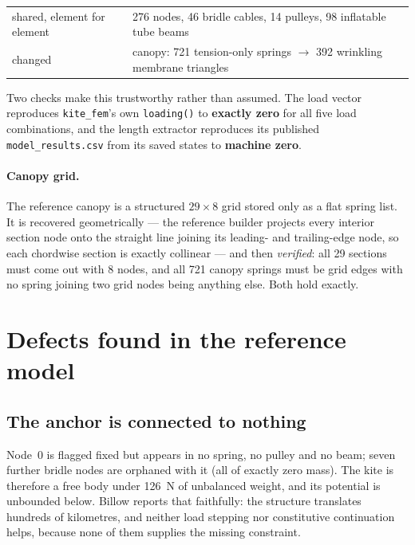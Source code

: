 \documentclass[11pt,a4paper]{article}
\begin{document}
\begin{center}
\begin{tabular}{ll}
\toprule
shared, element for element & 276 nodes, 46 bridle cables, 14 pulleys,
                              98 inflatable tube beams \\
changed & canopy: 721 tension-only springs $\rightarrow$ 392 wrinkling
          membrane triangles \\
\bottomrule
\end{tabular}
\end{center}

Two checks make this trustworthy rather than assumed. The load vector
reproduces \texttt{kite\_fem}'s own \texttt{loading()} to \textbf{exactly zero}
for all five load combinations, and the length extractor reproduces its
published \texttt{model\_results.csv} from its saved states to
\textbf{machine zero}.

\paragraph{Canopy grid.} The reference canopy is a structured $29\times8$ grid
stored only as a flat spring list. It is recovered geometrically --- the
reference builder projects every interior section node onto the straight line
joining its leading- and trailing-edge node, so each chordwise section is
exactly collinear --- and then \emph{verified}: all 29 sections must come out
with 8 nodes, and all 721 canopy springs must be grid edges with no spring
joining two grid nodes being anything else. Both hold exactly.

\section{Defects found in the reference model}

\subsection{The anchor is connected to nothing}

Node~0 is flagged fixed but appears in no spring, no pulley and no beam; seven
further bridle nodes are orphaned with it (all of exactly zero mass). The kite
is therefore a free body under \SI{126}{N} of unbalanced weight, and its
potential is unbounded below. Billow reports that faithfully: the structure
translates hundreds of kilometres, and neither load stepping nor constitutive
continuation helps, because none of them supplies the missing constraint.
\end{document}
